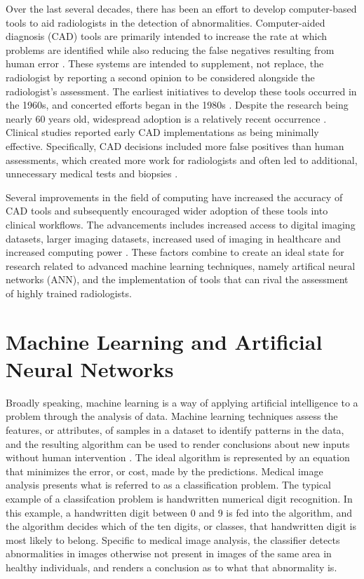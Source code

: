 \documentclass[sigconf]{acmart}
\begin{document}
Over the last several decades, there has been an effort to develop computer-based tools to aid radiologists in the detection of abnormalities. Computer-aided diagnosis (CAD) tools are primarily intended to increase the rate at which problems are identified while also reducing the false negatives resulting from human error \cite{cite06}. These systems are intended to supplement, not replace, the radiologist by reporting a second opinion to be considered alongside the radiologist's assessment. The earliest initiatives to develop these tools occurred in the 1960s, and concerted efforts began in the 1980s \cite{cite02}. Despite the research being nearly 60 years old, widespread adoption is a relatively recent occurrence \cite{cite03}. Clinical studies reported early CAD implementations as being minimally effective. Specifically, CAD decisions included more false positives than human assessments, which created more work for radiologists and often led to additional, unnecessary medical tests and biopsies \cite{cite05}.

Several improvements in the field of computing have increased the accuracy of CAD tools and subsequently encouraged wider adoption of these tools into clinical workflows. The advancements includes increased access to digital imaging datasets, larger imaging datasets, increased used of imaging in healthcare and increased computing power \cite{cite03}\cite{cite05}. These factors combine to create an ideal state for research related to advanced machine learning techniques, namely artifical neural networks (ANN), and the implementation of tools that can rival the assessment of highly trained radiologists.

\section{Machine Learning and Artificial Neural Networks}

Broadly speaking, machine learning is a way of applying artificial intelligence to a problem through the analysis of data. Machine learning techniques assess the features, or attributes, of samples in a dataset to identify patterns in the data, and the resulting algorithm can be used to render conclusions about new inputs without human intervention \cite{cite05}. The ideal algorithm is represented by an equation that minimizes the error, or cost, made by the predictions. Medical image analysis presents what is referred to as a classification problem. The typical example of a classifcation problem is handwritten numerical digit recognition. In this example, a handwritten digit between 0 and 9 is fed into the algorithm, and the algorithm decides which of the ten digits, or classes, that handwritten digit is most likely to belong. Specific to medical image analysis, the classifier detects abnormalities in images otherwise not present in images of the same area in healthy individuals, and renders a conclusion as to what that abnormality is.
\end{document}
